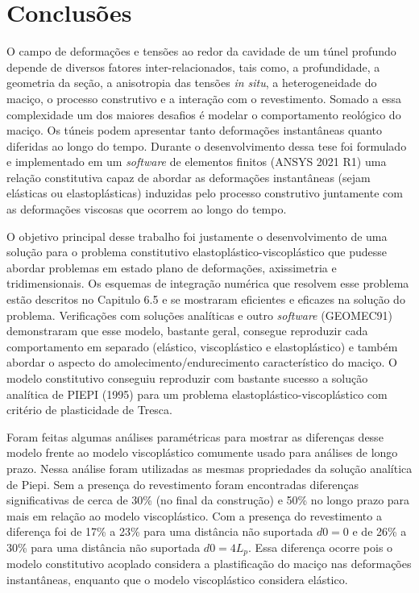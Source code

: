 \chapter{Conclusões}\label{Conclusoes}


O campo de deformações e tensões ao redor da cavidade de um túnel profundo depende de diversos fatores inter-relacionados, tais como, a profundidade, a geometria da seção, a anisotropia das tensões \textit{in situ}, a heterogeneidade do maciço, o processo construtivo e a interação com o revestimento. Somado a essa complexidade um dos maiores desafios é modelar o comportamento reológico do maciço. Os túneis podem apresentar tanto deformações instantâneas quanto diferidas ao longo do tempo. Durante o desenvolvimento dessa tese foi formulado e implementado em um \textit{software} de elementos finitos (ANSYS 2021 R1) uma relação constitutiva capaz de abordar as deformações instantâneas (sejam elásticas ou elastoplásticas) induzidas pelo processo construtivo juntamente com as deformações viscosas que ocorrem ao longo do tempo.

O objetivo principal desse trabalho foi justamente o desenvolvimento de uma solução para o problema constitutivo elastoplástico-viscoplástico que pudesse abordar problemas em estado plano de deformações, axissimetria e tridimensionais. Os esquemas de integração numérica que resolvem esse problema estão descritos no Capitulo 6.5 e se mostraram eficientes e eficazes na solução do problema. Verificações com soluções analíticas e outro \textit{software} (GEOMEC91) demonstraram que esse modelo, bastante geral, consegue reproduzir cada comportamento em separado (elástico, viscoplástico e elastoplástico) e também abordar o aspecto do amolecimento/endurecimento característico do maciço. O modelo constitutivo conseguiu reproduzir com bastante sucesso a solução analítica de PIEPI (1995) para um problema elastoplástico-viscoplástico com critério de plasticidade de Tresca.

Foram feitas algumas análises paramétricas para mostrar as diferenças desse modelo frente ao modelo viscoplástico comumente usado para análises de longo prazo. Nessa análise foram utilizadas as mesmas propriedades da solução analítica de Piepi. Sem a presença do revestimento foram encontradas diferenças significativas de cerca de 30\% (no final da construção) e 50\% no longo prazo para mais em relação ao modelo viscoplástico. Com a presença do revestimento a diferença foi de 17\% a 23\% para uma distância não suportada $d0=0$ e de 26\% a 30\% para uma distância não suportada $d0=4L_p$. Essa diferença ocorre pois o modelo constitutivo acoplado considera a plastificação do maciço nas deformações instantâneas, enquanto que o modelo viscoplástico considera elástico.

